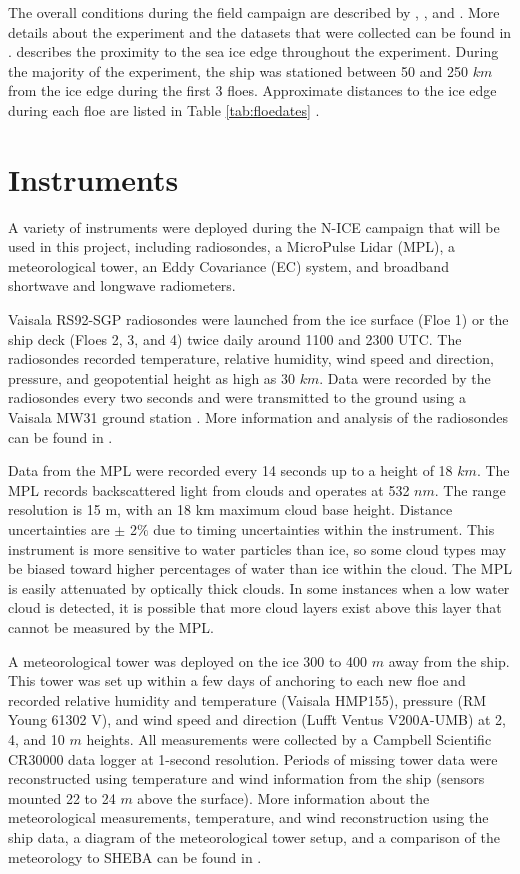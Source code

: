  The overall conditions during the field campaign are described by \citet{cohen:2017}, \citet{kayser:2017}, and \citet{walden:2017}. More details about the experiment and the datasets that were collected can be found in \citet{granskog:2015}. \citet{itkin:2017} describes the proximity to the sea ice edge throughout the experiment. During the majority of the experiment, the ship was stationed between 50 and 250 $km$ from the ice edge during the first 3 floes. Approximate distances to the ice edge during each floe are listed in Table \ref{tab:floedates} \citep{oikkonen:2017}.

\section{Instruments}
A variety of instruments were deployed during the N-ICE campaign that will be used in this project, including radiosondes, a MicroPulse Lidar (MPL), a meteorological tower, an Eddy Covariance (EC) system, and broadband shortwave and longwave radiometers. 

Vaisala RS92-SGP radiosondes were launched from the ice surface (Floe 1) or the ship deck (Floes 2, 3, and 4) twice daily around 1100 and 2300 UTC. The radiosondes recorded temperature, relative humidity, wind speed and direction, pressure, and geopotential height as high as 30 $km$. Data were recorded by the radiosondes every two seconds and were transmitted to the ground using a Vaisala MW31 ground station \citep{kayser:2017, cohen:2017}. More information and analysis of the radiosondes can be found in \citet{kayser:2017}.

Data from the MPL were recorded every 14 seconds up to a height of 18 $km$. The MPL records backscattered light from clouds and operates at 532 $nm$. The range resolution is 15 m, with an 18 km maximum cloud base height. Distance uncertainties are $\pm$ 2$\%$ due to timing uncertainties within the instrument. This instrument is more sensitive to water particles than ice, so some cloud types may be biased toward higher percentages of water than ice within the cloud. The MPL is easily attenuated by optically thick clouds. In some instances when a low water cloud is detected, it is possible that more cloud layers exist above this layer that cannot be measured by the MPL. 

A meteorological tower was deployed on the ice 300 to 400 $m$ away from the ship. This tower was set up within a few days of anchoring to each new floe and recorded relative humidity and temperature (Vaisala HMP155), pressure (RM Young 61302 V), and wind speed and direction (Lufft Ventus V200A-UMB) at 2, 4, and 10 $m$ heights. All measurements were collected by a Campbell Scientific CR30000 data logger at 1-second resolution. Periods of missing tower data were reconstructed using temperature and wind information from the ship (sensors mounted 22 to 24 $m$ above the surface). More information about the meteorological measurements, temperature, and wind reconstruction using the ship data, a diagram of the meteorological tower setup, and a comparison of the meteorology to SHEBA can be found in \citet{cohen:2017}.

